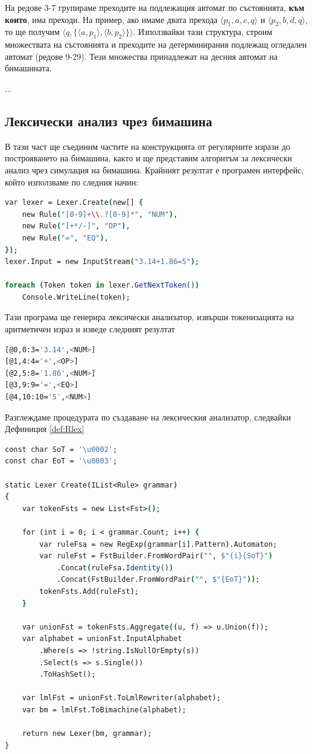 \documentclass[12pt, oneside]{article}
\theoremstyle{definition}
\begin{document}
На редове 3-7 групираме преходите на подлежащия автомат по състоянията, \textbf{към които}, има преходи. На пример, ако имаме двата прехода \( \langle p_1, a, c, q \rangle \) и \( \langle p_2, b, d, q \rangle \), то ще получим \( \langle q, \{ \langle a, p_1 \rangle, \langle b, p_2 \rangle \} \rangle \). Използвайки тази структура, строим множествата на състоянията и преходите на детерминирания подлежащ огледален автомат (редове 9-29). Тези множества принадлежат на десния автомат на бимашината.

...

\subsection{Лексически анализ чрез бимашина}

В тази част ще съединим частите на конструкцията от регулярните изрази до построяването на бимашина, както и ще представим алгоритъм за лексически анализ чрез симулация на бимашина. Крайният резултат е програмен интерфейс, който използваме по следния начин:

\begin{lstlisting}[language=csh,firstnumber=1]
var lexer = Lexer.Create(new[] {
    new Rule("[0-9]+\\.?[0-9]*", "NUM"),
    new Rule("[+*/-]", "OP"),
    new Rule("=", "EQ"),
});
lexer.Input = new InputStream("3.14+1.86=5");

foreach (Token token in lexer.GetNextToken())
    Console.WriteLine(token);
\end{lstlisting}

Тази програма ще генерира лексически анализатор, извърши токенизацията на аритметичен израз и изведе следният резултат

\begin{lstlisting}[language=bash]
[@0,0:3='3.14',<NUM>]
[@1,4:4='+',<OP>]
[@2,5:8='1.86',<NUM>]
[@3,9:9='=',<EQ>]
[@4,10:10='5',<NUM>]
\end{lstlisting}

Разглеждаме процедурата по създаване на лексическия анализатор, следвайки Дефиниция \ref{def:Rlex}

\begin{lstlisting}[language=csh]
const char SoT = '\u0002';
const char EoT = '\u0003';

static Lexer Create(IList<Rule> grammar)
{
    var tokenFsts = new List<Fst>();

    for (int i = 0; i < grammar.Count; i++) {
        var ruleFsa = new RegExp(grammar[i].Pattern).Automaton;
        var ruleFst = FstBuilder.FromWordPair("", $"{i}{SoT}")
            .Concat(ruleFsa.Identity())
            .Concat(FstBuilder.FromWordPair("", $"{EoT}"));
        tokenFsts.Add(ruleFst);
    }

    var unionFst = tokenFsts.Aggregate((u, f) => u.Union(f));
    var alphabet = unionFst.InputAlphabet
        .Where(s => !string.IsNullOrEmpty(s))
        .Select(s => s.Single())
        .ToHashSet();

    var lmlFst = unionFst.ToLmlRewriter(alphabet);
    var bm = lmlFst.ToBimachine(alphabet);

    return new Lexer(bm, grammar);
}
\end{lstlisting}
\end{document}
